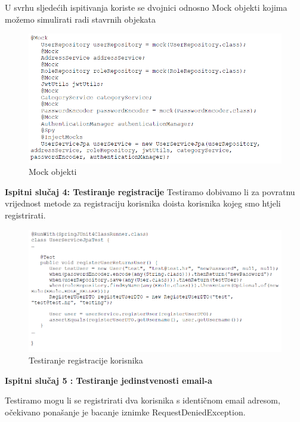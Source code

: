 		U svrhu sljedećih ispitivanja koriste se dvojnici odnosno Mock objekti kojima možemo simulirati radi stavrnih objekata
		
		\begin{figure}[H]
			\includegraphics[scale=0.7]{slike/test3a.PNG} %
			\centering
			\caption{Mock objekti}
			\label{fig:test3a}
		\end{figure}
		
		
		\textbf{Ispitni slučaj 4: Testiranje registracije}
		Testiramo dobivamo li za povratnu vrijednost metode za registraciju korisnika doista korisnika kojeg smo htjeli registrirati.
		
		
		\begin{figure}[H]
			\includegraphics[scale=0.7]{slike/test4.PNG} %
			\centering
			\caption{Testiranje registracije korisnika}
			\label{fig:test4}
		\end{figure}
	
	\textbf{Ispitni slučaj 5 : Testiranje jedinstvenosti email-a}
	
	Testiramo mogu li se registrirati dva korisnika s identičnom email adresom, očekivano ponašanje je bacanje iznimke RequestDeniedException. 
	
